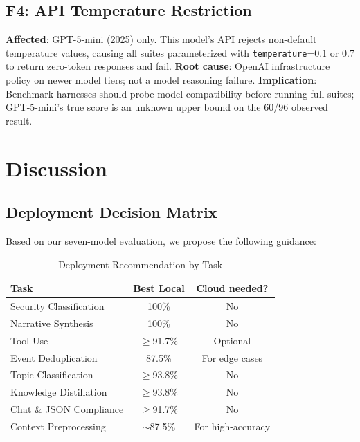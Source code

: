\documentclass[onecolumn,10pt]{IEEEtran}
\begin{document}
\subsection{F4: API Temperature Restriction}
\textbf{Affected}: GPT-5-mini (2025) only. This model's API rejects
non-default temperature values, causing all suites parameterized with
\texttt{temperature}=0.1 or 0.7 to return zero-token responses and fail.
\textbf{Root cause}: OpenAI infrastructure policy on newer model tiers;
not a model reasoning failure.
\textbf{Implication}: Benchmark harnesses should probe model compatibility
before running full suites; GPT-5-mini's true score is an unknown
upper bound on the 60/96 observed result.


\section{Discussion}

\subsection{Deployment Decision Matrix}

Based on our seven-model evaluation, we propose the following guidance:

\begin{table}[h]
\centering
\caption{Deployment Recommendation by Task}
\label{tab:recommend}
\small
\begin{tabular}{p{2.6cm}cc}
\toprule
\textbf{Task} & \textbf{Best Local} & \textbf{Cloud needed?} \\
\midrule
Security Classification & 100\% & No \\
Narrative Synthesis & 100\% & No \\
Tool Use & $\geq$91.7\% & Optional \\
Event Deduplication & 87.5\% & For edge cases \\
Topic Classification & $\geq$93.8\% & No \\
Knowledge Distillation & $\geq$93.8\% & No \\
Chat \& JSON Compliance & $\geq$91.7\% & No \\
Context Preprocessing & $\sim$87.5\% & For high-accuracy \\
\bottomrule
\end{tabular}
\end{table}
\end{document}
